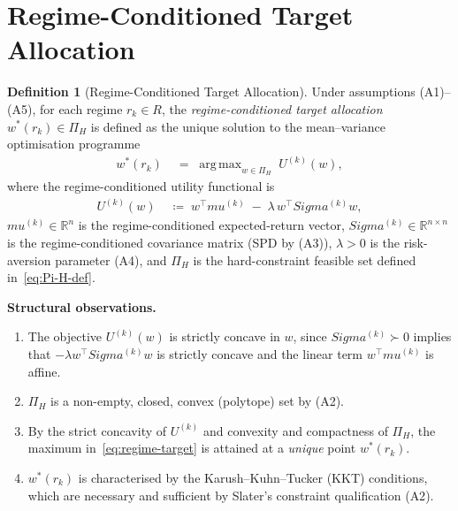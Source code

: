 \documentclass[12pt,openany]{book}
\newcommand{\bfw}{\mathbf{w}}
\newcommand{\bfmu}{\boldsymbol{\mu}}
\newcommand{\bfSigma}{\boldsymbol{\Sigma}}
\DeclareMathOperator*{\argmax}{arg\,max}
\numberwithin{equation}{chapter}
\theoremstyle{plain}
\theoremstyle{definition}
\newtheorem{definition}[theorem]{Definition}
\theoremstyle{remark}
\def\mathcal#1{#1}%
\def\bfw{w}%
\def\bfmu{mu}%
\def\bfSigma{Sigma}%
\begin{document}
\section{Regime-Conditioned Target Allocation}
\label{sec:regime-target-def}

\begin{definition}[Regime-Conditioned Target Allocation]
\label{def:regime-target}
Under assumptions \textup{(A1)--(A5)}, for each regime
$r_k \in \mathcal{R}$, the \emph{regime-conditioned target allocation}
$\bfw^{*}(r_k) \in \Pi_H$ is defined as the unique solution to
the mean--variance optimisation programme
\begin{align}
  \bfw^{*}(r_k)
  \;&=\;
  \argmax_{\bfw \in \Pi_H}
  \;\mathcal{U}^{(k)}(\bfw),
  \label{eq:regime-target}
\end{align}
where the regime-conditioned utility functional is
\begin{align}
  \mathcal{U}^{(k)}(\bfw)
  \;&\coloneqq\;
  \bfw^\top \bfmu^{(k)}
  \;-\;
  \lambda\,\bfw^\top \bfSigma^{(k)} \bfw,
  \label{eq:regime-utility}
\end{align}
$\bfmu^{(k)} \in \mathbb{R}^n$ is the regime-conditioned
expected-return vector, $\bfSigma^{(k)} \in \mathbb{R}^{n\times n}$
is the regime-conditioned covariance matrix (SPD by
\textup{(A3)}), $\lambda > 0$ is the risk-aversion parameter
(\textup{A4}), and $\Pi_H$ is the hard-constraint feasible set
defined in~\eqref{eq:Pi-H-def}.

\medskip
\noindent
\textbf{Structural observations.}
\begin{enumerate}
  \item The objective $\mathcal{U}^{(k)}(\bfw)$ is strictly
        concave in $\bfw$, since $\bfSigma^{(k)} \succ 0$
        implies that $-\lambda\bfw^\top\bfSigma^{(k)}\bfw$ is
        strictly concave and the linear term
        $\bfw^\top\bfmu^{(k)}$ is affine.

  \item $\Pi_H$ is a non-empty, closed, convex (polytope) set
        by \textup{(A2)}.

  \item By the strict concavity of $\mathcal{U}^{(k)}$ and
        convexity and compactness of $\Pi_H$, the maximum
        in~\eqref{eq:regime-target} is attained at a
        \emph{unique} point $\bfw^{*}(r_k)$.

  \item $\bfw^{*}(r_k)$ is characterised by the
        Karush--Kuhn--Tucker (KKT) conditions, which are
        necessary and sufficient by Slater's constraint
        qualification (\textup{A2}).
\end{enumerate}
\end{definition}
\end{document}
